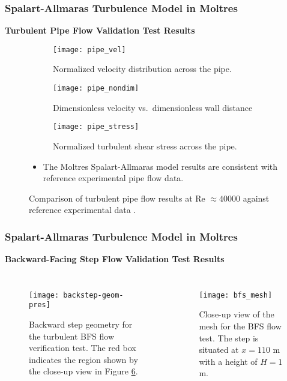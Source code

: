 \begin{frame}
  \frametitle{Spalart-Allmaras Turbulence Model in Moltres}
  \textbf{Turbulent Pipe Flow Validation Test Results}
  \begin{figure}[htb]
    \centering
    \begin{subfigure}[b]{0.32\columnwidth}
      \centering
      \texttt{[image: pipe\_vel]}
      \caption{Normalized velocity distribution across the pipe.}
      \label{fig:pipe-vel}
    \end{subfigure}
    \hfill
    \begin{subfigure}[b]{0.32\columnwidth}
      \centering
      \texttt{[image: pipe\_nondim]}
      \caption{Dimensionless velocity vs.\ dimensionless wall distance}
      \label{fig:pipe-nondim}
    \end{subfigure}
    \begin{subfigure}[b]{0.32\columnwidth}
      \centering
      \texttt{[image: pipe\_stress]}
      \caption{Normalized turbulent shear stress across the pipe.}
      \label{fig:pipe-stress}
    \end{subfigure}
    \caption{Comparison of turbulent pipe flow results at Re $\approx 40000$ against reference
    experimental data \cite{laufer_structure_1954}.}
    \label{fig:pipe-verification}
  \begin{itemize}
    \item The Moltres Spalart-Allmaras model results are consistent with reference experimental pipe flow data.
  \end{itemize}
  \end{figure}
\end{frame}

\begin{frame}
  \frametitle{Spalart-Allmaras Turbulence Model in Moltres}
  \textbf{Backward-Facing Step Flow Validation Test Results}
  \begin{columns}
    \column{5.5cm}
    \begin{figure}[h]
      \centering
      \texttt{[image: backstep-geom-pres]}
      \caption{Backward step geometry for the turbulent BFS flow verification test. The red box indicates
      the region shown by the close-up view in Figure \ref{fig:bfs-mesh}.}
      \label{fig:backstep-geom}
    \end{figure}
    \column{5.5cm}
    \begin{figure}[h]
      \centering
      \texttt{[image: bfs\_mesh]}
      \caption{Close-up view of the mesh for the BFS flow test. The step is situated at $x=110$ m
      with a height of $H=1$ m.}
      \label{fig:bfs-mesh}
    \end{figure}
  \end{columns}
\end{frame}

